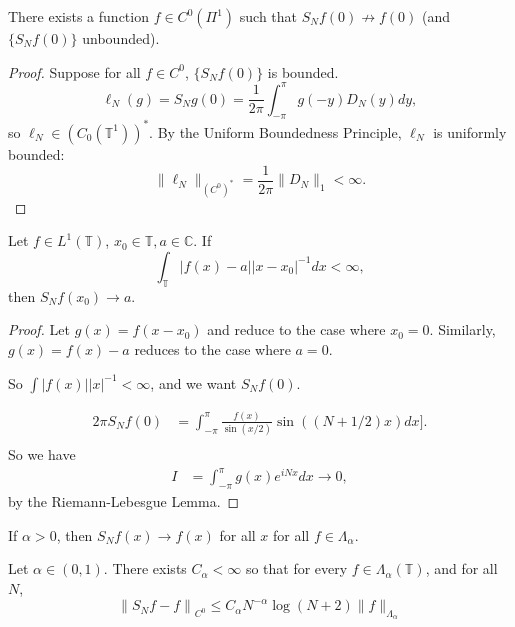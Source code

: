 \documentclass[11pt]{scrartcl}
\newcommand{\C}{\mathbb C}
\newcommand{\T}{\mathbb T}
\newcommand{\<}{\langle}
\renewcommand{\>}{\rangle}
\begin{document}
\begin{thm} There exists a function $f \in C^0(\Pi^1)$ such that $S_Nf(0) \not \rightarrow f(0)$ (and $\{S_Nf(0)\}$ unbounded).
\end{thm}
\begin{proof}
Suppose for all $f \in C^0$, $\{S_Nf(0)\}$ is bounded.
$$\ell_N(g) = S_N g(0) = \frac{1}{2\pi} \int_{-\pi}^\pi g(-y)D_N(y) dy,$$
so $\ell_N \in (C_0(\T^1))^*$.  By the Uniform Boundedness Principle, $\ell_N$ is uniformly bounded: $$\|\ell_N\|_{(C^0)^*} = \frac{1}{2\pi} \|D_N\|_1 < \infty.$$
\end{proof}
\begin{thm} Let $f \in L^1(\T)$, $x_0 \in \T, a \in \C$.  If 
$$\int _\T |f(x) - a||x - x_0|^{-1} dx < \infty,$$
then $S_Nf(x_0)\rightarrow a$.
\end{thm}
\begin{proof}
Let $g(x) = f(x - x_0)$ and reduce to the case where $x_0 = 0$.  Similarly, $g(x) = f(x) - a$ reduces to the case where $a = 0$.

So $\int |f(x)||x|^{-1} < \infty$, and we want $S_Nf(0)$.

\begin{align*}
2\pi S_Nf(0) &= \int_{-\pi}^\pi \frac{f(x)}{\sin(x/2)} \sin((N+1/2)x)dx ].\\
\end{align*}
So we have 
\begin{align*}
I &= \int_{-\pi}^\pi g(x)e^{iNx}dx \rightarrow 0,
\end{align*}
by the Riemann-Lebesgue Lemma.
\end{proof}
\begin{corollary} If $\alpha > 0$, then $S_Nf(x) \rightarrow f(x)$ for all $x$ for all $f \in \Lambda_\alpha$.
\end{corollary}
\begin{thm} Let $\alpha \in (0 ,1)$.  There exists $C_\alpha < \infty$ so that for every $f \in \Lambda_\alpha(\T)$, and for all $N$, 
$$\left\| S_Nf - f\right \|_{C^0} \le C_\alpha N^{-\alpha} \log(N + 2)\|f\|_{\Lambda_\alpha}$$
\end{thm}
\end{document}
